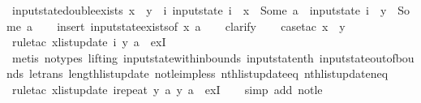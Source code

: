 \begin{isabellebody}
\endisatagproof
{\isafoldproof}%
%
\isadelimproof
\isanewline
%
\endisadelimproof
\isanewline
{}\isamarkupfalse%
\ input{}state{\isacharunderscore}double{\isacharunderscore}exists{\isacharunderscore}{}{\isacharcolon}\ {\isachardoublequoteopen}x\ {\isasymnoteq}\ y\ {\isasymLongrightarrow}\ {\isasymexists}i{\isachardot}\ input{}state\ i\ {\isachardollar}\ x\ {\isacharequal}\ Some\ a\ {\isasymand}\ input{}state\ i\ {\isachardollar}\ y\ {\isacharequal}\ Some\ a{\isacharprime}{\isachardoublequoteclose}\isanewline
%
\isadelimproof
\ \ %
\endisadelimproof
%
\isatagproof
{}\isamarkupfalse%
\ {\isacharparenleft}insert\ input{}state{\isacharunderscore}exists{\isacharbrackleft}of\ x\ a{\isacharbrackright}{\isacharparenright}\isanewline
\ \ \isamarkupfalse%
\ clarify\isanewline
\ \ \isamarkupfalse%
\ {\isacharparenleft}case{\isacharunderscore}tac\ {\isachardoublequoteopen}x\ {\isasymge}\ y{\isachardoublequoteclose}{\isacharparenright}\isanewline
\ \ \isamarkupfalse%
\ {\isacharparenleft}rule{\isacharunderscore}tac\ x{\isacharequal}{\isachardoublequoteopen}list{\isacharunderscore}update\ i\ y\ a{\isacharprime}{\isachardoublequoteclose}\ \ exI{\isacharparenright}\isanewline
\ \ \isamarkupfalse%
\ {\isacharparenleft}metis\ {\isacharparenleft}no{\isacharunderscore}types{\isacharcomma}\ lifting{\isacharparenright}\ input{}state{\isacharunderscore}within{\isacharunderscore}bounds\ input{}state{\isacharunderscore}nth\ input{}state{\isacharunderscore}out{\isacharunderscore}of{\isacharunderscore}bounds\ le{\isacharunderscore}trans\ length{\isacharunderscore}list{\isacharunderscore}update\ not{\isacharunderscore}le{\isacharunderscore}imp{\isacharunderscore}less\ nth{\isacharunderscore}list{\isacharunderscore}update{\isacharunderscore}eq\ nth{\isacharunderscore}list{\isacharunderscore}update{\isacharunderscore}neq{\isacharparenright}\isanewline
\ \ \isamarkupfalse%
\ {\isacharparenleft}rule{\isacharunderscore}tac\ x{\isacharequal}{\isachardoublequoteopen}list{\isacharunderscore}update\ {\isacharparenleft}i{\isacharat}{\isacharparenleft}repeat\ y\ a{\isacharprime}{\isacharparenright}{\isacharparenright}\ y\ a{\isacharprime}{\isachardoublequoteclose}\ \ exI{\isacharparenright}\isanewline
\ \ \isamarkupfalse%
\ {\isacharparenleft}simp\ add{\isacharcolon}\ not{\isacharunderscore}le{\isacharparenright}\isanewline
\ \ \isamarkupfalse%

\end{isabellebody}
